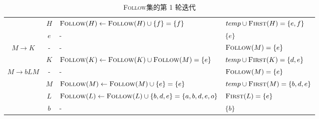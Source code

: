 \documentclass[UTF8]{ctexart}
\newcommand\FIRST{\textsc{First}}
\newcommand\FOLLOW{\textsc{Follow}}
\begin{document}
\begin{landscape}
\begin{table}[p]
\begin{tabular}{|c|c|l|l|}
                   & $H$ & $\FOLLOW(H) \gets \FOLLOW(H) \cup\{f\} = \{f\}$ & $temp\cup\FIRST(H) = \{e,f\}$ \\
                   & $e$ & - & $\{e\}$ \\
    \hline
        $M\to K$ & - & - & $\FOLLOW(M) = \{e\}$ \\
                 & $K$ & $\FOLLOW(K)\gets \FOLLOW(K)\cup\FOLLOW(M) = \{e\}$ & $temp\cup\FIRST(K) = \{d,e\}$ \\
    \hline
        $M\to bLM$ & - & - & $\FOLLOW(M) = \{e\}$ \\
                   & $M$ & $\FOLLOW(M)\gets \FOLLOW(M)\cup\{e\} = \{e\}$ & $temp\cup \FIRST(M) = \{b,d,e\}$ \\
                   & $L$ & $\FOLLOW(L)\gets \FOLLOW(L)\cup\{b,d,e\} = \{a,b,d,e,o\}$ & $\FIRST(L) = \{e\}$ \\
                   & $b$ & - & $\{b\}$ \\
    \hline
    \end{tabular}
    \caption{\FOLLOW 集的第 1 轮迭代}\label{tab:FOLLOW-1}
\end{table}


\end{landscape}
\end{document}

